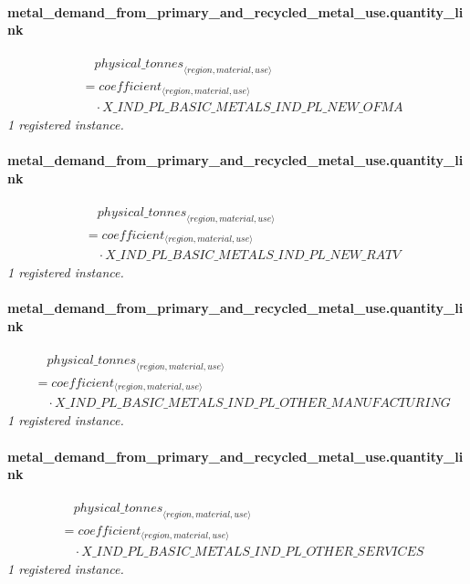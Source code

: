 \documentclass[11pt]{article}
\begin{document}
\paragraph{metal\_demand\_from\_primary\_and\_recycled\_metal\_use.quantity\_link}
\begin{align*}
&\quad {physical\_tonnes}_{\langle region, material, use\rangle}\\
&= coefficient_{\langle region, material, use\rangle}\\
&\quad {}\cdot X\_IND\_PL\_BASIC\_METALS\_IND\_PL\_NEW\_OFMA
\end{align*}
\noindent\emph{1 registered instance.}\par
\paragraph{metal\_demand\_from\_primary\_and\_recycled\_metal\_use.quantity\_link}
\begin{align*}
&\quad {physical\_tonnes}_{\langle region, material, use\rangle}\\
&= coefficient_{\langle region, material, use\rangle}\\
&\quad {}\cdot X\_IND\_PL\_BASIC\_METALS\_IND\_PL\_NEW\_RATV
\end{align*}
\noindent\emph{1 registered instance.}\par
\paragraph{metal\_demand\_from\_primary\_and\_recycled\_metal\_use.quantity\_link}
\begin{align*}
&\quad {physical\_tonnes}_{\langle region, material, use\rangle}\\
&= coefficient_{\langle region, material, use\rangle}\\
&\quad {}\cdot X\_IND\_PL\_BASIC\_METALS\_IND\_PL\_OTHER\_MANUFACTURING
\end{align*}
\noindent\emph{1 registered instance.}\par
\paragraph{metal\_demand\_from\_primary\_and\_recycled\_metal\_use.quantity\_link}
\begin{align*}
&\quad {physical\_tonnes}_{\langle region, material, use\rangle}\\
&= coefficient_{\langle region, material, use\rangle}\\
&\quad {}\cdot X\_IND\_PL\_BASIC\_METALS\_IND\_PL\_OTHER\_SERVICES
\end{align*}
\noindent\emph{1 registered instance.}\par
\end{document}
